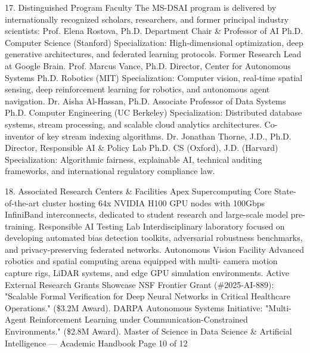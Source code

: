 \documentclass[12pt]{article}
\begin{document}
17. Distinguished Program Faculty
The MS-DSAI program is delivered by internationally recognized scholars, researchers, and former principal industry
scientists:
Prof. Elena Rostova, Ph.D.
Department Chair \& Professor of AI
Ph.D. Computer Science (Stanford)
Specialization: High-dimensional optimization, deep generative
architectures, and federated learning protocols. Former
Research Lead at Google Brain.
Prof. Marcus Vance, Ph.D.
Director, Center for Autonomous Systems
Ph.D. Robotics (MIT)
Specialization: Computer vision, real-time spatial sensing, deep
reinforcement learning for robotics, and autonomous agent
navigation.
Dr. Aisha Al-Hassan, Ph.D.
Associate Professor of Data Systems
Ph.D. Computer Engineering (UC Berkeley)
Specialization: Distributed database systems, stream
processing, and scalable cloud analytics architectures. Co-
inventor of key stream indexing algorithms.
Dr. Jonathan Thorne, J.D., Ph.D.
Director, Responsible AI \& Policy Lab
Ph.D. CS (Oxford), J.D. (Harvard)
Specialization: Algorithmic fairness, explainable AI, technical
auditing frameworks, and international regulatory compliance
law.

18. Associated Research Centers \& Facilities
Apex Supercomputing Core
State-of-the-art cluster hosting 64x
NVIDIA H100 GPU nodes with 100Gbps
InfiniBand interconnects, dedicated to
student research and large-scale model
pre-training.
Responsible AI Testing Lab
Interdisciplinary laboratory focused on
developing automated bias detection
toolkits, adversarial robustness
benchmarks, and privacy-preserving
federated networks.
Autonomous Vision Facility
Advanced robotics and spatial
computing arena equipped with multi-
camera motion capture rigs, LiDAR
systems, and edge GPU simulation
environments.
Active External Research Grants Showcase
NSF Frontier Grant (\#2025-AI-889): "Scalable Formal Verification for Deep Neural Networks in Critical Healthcare
Operations." (\$3.2M Award).
DARPA Autonomous Systems Initiative: "Multi-Agent Reinforcement Learning under Communication-Constrained
Environments." (\$2.8M Award).
Master of Science in Data Science \& Artificial Intelligence — Academic Handbook
Page 10 of 12
\end{document}
